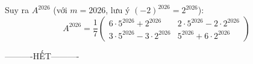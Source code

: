 \documentclass[12pt,a4paper]{article}
\begin{document}
Suy ra $A^{2026}$ (với $m = 2026$, lưu ý $(-2)^{2026} = 2^{2026}$):
\[
A^{2026} = \frac{1}{7} \begin{pmatrix} 6\cdot 5^{2026} + 2^{2026} & 2\cdot 5^{2026} - 2\cdot 2^{2026} \\ 3\cdot 5^{2026} - 3\cdot 2^{2026} & 5^{2026} + 6\cdot 2^{2026} \end{pmatrix}
\]

\begin{center}
----------HẾT----------
\end{center}
\end{document}
